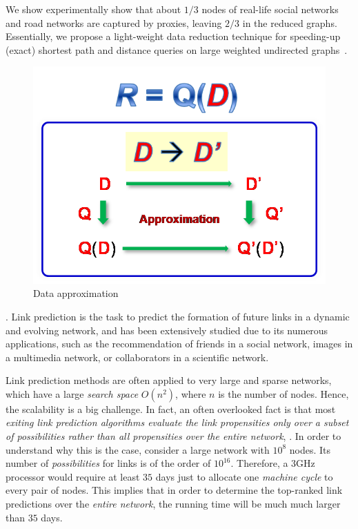 We show experimentally show that about $1/3$  nodes of real-life social networks and road networks  are captured by proxies, leaving $2/3$ in the reduced graphs.
Essentially, we propose a light-weight data reduction technique for speeding-up (exact)  shortest path and distance queries on large weighted undirected graphs~\cite{MaFLWCH16}.




\begin{figure}[tb!]
  \vspace{-1ex}
  \begin{center}
  \includegraphics[scale=0.5]{./dataApprox.png}
  \end{center}
  \vspace{-3ex}
  \caption{Data approximation}\label{fig-tech-dataappro}
  \vspace{-2ex}
\end{figure}

. Link prediction is the task to predict the formation of future links in a dynamic and evolving network, and has been extensively studied due to its numerous applications, such as the recommendation of friends in a social network, images in a multimedia network, or
collaborators in a scientific network.


Link prediction methods are often applied to very large and sparse networks, which have a large {\em search space} $O(n^2)$,
where $n$ is the number of nodes. Hence, the scalability is a big challenge. In fact, an often overlooked fact is that most {\em exiting link prediction algorithms evaluate the link propensities only over a subset of possibilities rather than all propensities over the entire network},
\eg \cite{zhu2016}.
In order to understand why this is the case, consider a large network with $10^8$ nodes. Its number of {\em possibilities} for links
is of the order of $10^{16}$. Therefore, a 3GHz processor would
require at least $35$ days just to allocate one {\em machine cycle} to
every pair of nodes. This implies that in order to determine the
top-ranked link predictions over the {\em entire network}, the
running time will be much much larger than $35$ days.

